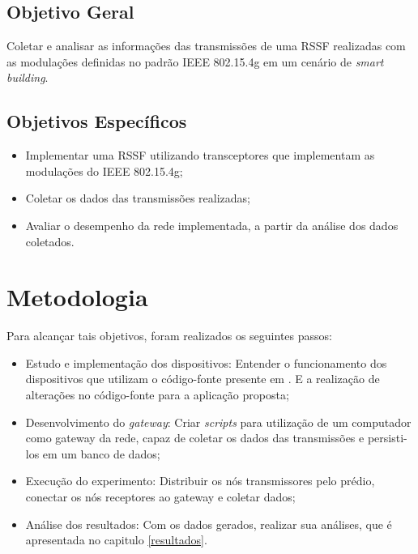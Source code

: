 \subsection{Objetivo Geral}
\label{subsec:objGeral}
Coletar e analisar as informações das transmissões de uma RSSF realizadas com as modulações definidas no padrão IEEE 802.15.4g em um cenário de \emph{smart building}.


\subsection{Objetivos Específicos}
\label{subsec:objespecificos}
\begin{itemize}
      \item Implementar uma RSSF utilizando transceptores que implementam as modulações do IEEE 802.15.4g;
      \item Coletar os dados das transmissões realizadas;
      \item Avaliar o desempenho da rede implementada, a partir da análise dos dados coletados.
\end{itemize}


\section{Metodologia}
\label{sec:metodologia}
Para alcançar tais objetivos, foram realizados os seguintes passos:


\begin{itemize}
      \item Estudo e implementação dos dispositivos: Entender o funcionamento dos dispositivos que utilizam o código-fonte presente em \cite{openmoteb-firmware}. E a realização de alterações no código-fonte para a aplicação proposta;
      \item Desenvolvimento do \emph{gateway}: Criar \emph{scripts} para utilização de um computador como gateway da rede, capaz de coletar os dados das transmissões e persisti-los em um banco de dados;
      \item Execução do experimento: Distribuir os nós transmissores pelo prédio, conectar os nós receptores ao gateway e coletar dados;
      \item Análise dos resultados: Com os dados gerados, realizar sua análises, que é apresentada no capitulo \ref{resultados}.
\end{itemize}